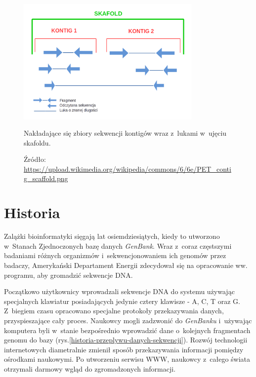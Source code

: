 \documentclass[a4paper,12pt,oneside]{mwrep}  %
\begin{document}
\begin{figure}[!h]
\centering
\includegraphics[width=0.8\textwidth]{grafika/contig_skafold.png}
\caption{Nakładające się zbiory sekwencji kontigów wraz z~lukami w~ujęciu skafoldu.}
\vspace{-0.8cm}
\caption*{\scriptsize Źródło: \url{https://upload.wikimedia.org/wikipedia/commons/6/6e/PET_contig_scaffold.png}}
\label{skafold_contig}
\end{figure}

\section{Historia}
Zalążki bioinformatyki sięgają lat osiemdziesiątych, kiedy to utworzono w~Stanach Zjednoczonych bazę danych \emph{GenBank}. Wraz z~coraz częstszymi badaniami różnych organizmów i~sekwencjonowaniem ich genomów przez badaczy, Amerykański Departament Energii zdecydował się na opracowanie ww. programu, aby gromadzić sekwencje DNA. %

Początkowo użytkownicy wprowadzali sekwencje DNA do systemu używając specjalnych klawiatur posiadających jedynie cztery klawisze - A, C, T oraz G. Z~biegiem czasu opracowano specjalne protokoły przekazywania danych, przyspieszające cały proces. Naukowcy mogli zadzwonić do \emph{GenBanku} i~używając komputera byli w~stanie bezpośrednio wprowadzić dane o~kolejnych fragmentach genomu do bazy (rys.\ref{historia-przeplywu-danych-sekwencji}). Rozwój technologii internetowych diametralnie zmienił sposób przekazywania informacji pomiędzy ośrodkami naukowymi. Po utworzeniu serwisu WWW, naukowcy z~całego świata otrzymali darmowy wgląd do zgromadzonych informacji. %
\end{document}
